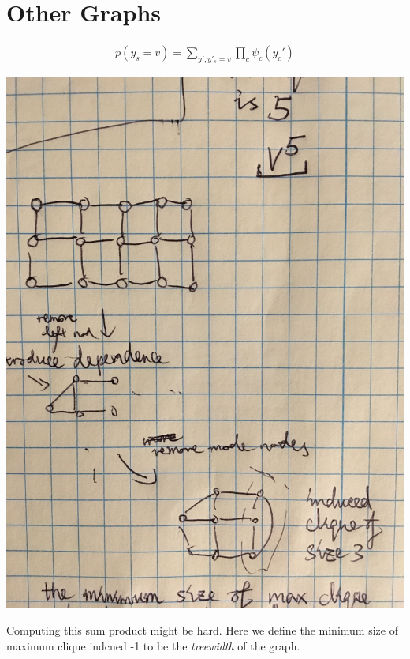 \documentclass{article}
\begin{document}
\section{Other Graphs}
\begin{align*}
p(y_s = v) = \sum_{y',y'_s=v}\prod_c\psi_c(y_c')
\end{align*}
\begin{center}
\includegraphics[scale=0.1]{g3.jpg}
\end{center}
Computing this sum product might be hard. Here we define the minimum size of maximum clique indcued -1 to be the \textit{treewidth} of the graph.
\end{document}

